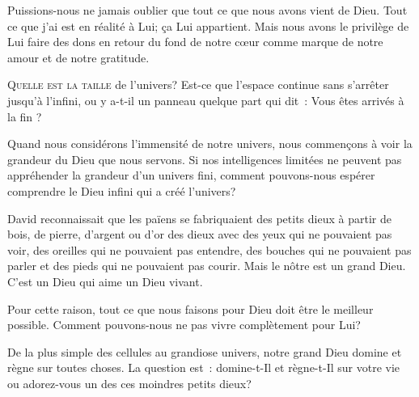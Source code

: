 Puissions-nous ne jamais oublier que tout ce que nous avons vient de Dieu.
 Tout ce que j'ai est en réalité à Lui; ça Lui appartient.
 Mais nous avons le privilège de Lui faire des dons en retour
 \ocadr du fond de notre c\oe{}ur \fcadr{} comme marque de notre amour
 et de notre gratitude. 

\dvrule






\lettrine{Q}{uelle est la taille} de l'univers?
 Est-ce que l'espace continue sans s'arrêter jusqu'à l'infini,
 ou y a-t-il un panneau quelque part qui dit~:
 \og Vous êtes arrivés à la fin \fg{} ? 

Quand nous considérons l'immensité de notre univers,
 nous commençons à voir la grandeur du Dieu que nous servons.
 Si nos intelligences limitées ne peuvent pas appréhender
 la grandeur d'un univers fini, comment pouvons-nous espérer
 comprendre le Dieu infini qui a créé l'univers? 

David reconnaissait que les païens se fabriquaient des petits dieux
 à partir de bois, de pierre, d'argent ou d'or \ocadr des dieux avec des yeux
 qui ne pouvaient pas voir, des oreilles qui ne pouvaient pas entendre,
 des bouches qui ne pouvaient pas parler et des pieds
 qui ne pouvaient pas courir. Mais le nôtre est un grand Dieu.
 C'est un Dieu qui aime \ocadr un Dieu vivant. 


Pour cette raison, tout ce que nous faisons pour Dieu
 doit être le meilleur possible.
 Comment pouvons-nous ne pas vivre complètement pour Lui? 

De la plus simple des cellules au grandiose univers,
 notre grand Dieu domine et règne sur toutes choses.
 La question est~: domine-t-Il et règne-t-Il sur votre vie
 \ocadr ou adorez-vous un des ces moindres petits dieux? 

